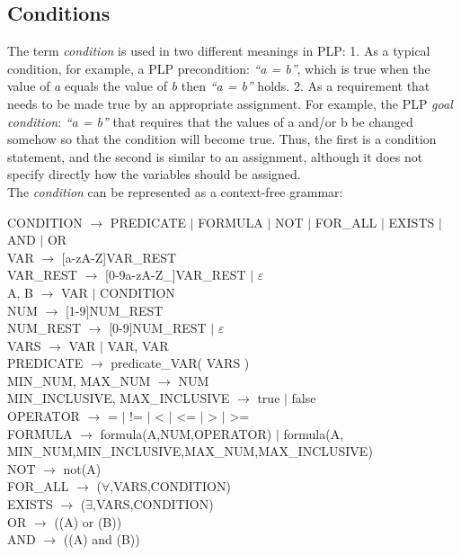 \subsection{Conditions}
The term \textit{condition} is used in two different meanings in PLP: 1. As a typical condition, for example, a PLP precondition: \textit{“a = b”}, which is true when the value of \textit{a} equals the value of \textit{b} then \textit{“a = b”} holds. 2. As a requirement that needs to be made true by an appropriate assignment. For example, the PLP \textit{\textit{goal condition}}: \textit{“a = b”} that requires that the values of a and/or b be changed somehow so that the condition will become true. Thus, the first is a condition statement, and the second is similar to an assignment, although it does not specify directly how the variables should be assigned. \\
The \textit{condition} can be represented as a context-free grammar: 
\begin{changemargin}{1.5cm}{0cm}
CONDITION $\rightarrow$ PREDICATE $\vert$ FORMULA $\vert$ NOT $\vert$ FOR_ALL $\vert$ EXISTS $\vert$ AND $\vert$ OR\\
VAR $\rightarrow$ [a-zA-Z]VAR_REST\\
VAR_REST $\rightarrow$ [0-9a-zA-Z_]VAR_REST $\vert$ $\varepsilon$\\
A, B $\rightarrow$ VAR $\vert$ CONDITION\\
NUM $\rightarrow$ [1-9]NUM_REST\\
NUM_REST $\rightarrow$ [0-9]NUM_REST $\vert$ $\varepsilon$\\
VARS $\rightarrow$ VAR $\vert$ VAR, VAR\\
PREDICATE $\rightarrow$ predicate_VAR( VARS )\\
MIN_NUM, MAX_NUM $\rightarrow$ NUM\\
MIN_INCLUSIVE, MAX_INCLUSIVE $\rightarrow$ true $\vert$ false\\
OPERATOR $\rightarrow$ = $\vert$ != $\vert$ < $\vert$ <= $\vert$ > $\vert$ >=\\
FORMULA $\rightarrow$ formula(A,NUM,OPERATOR) $\vert$ formula(A, MIN_NUM,MIN_INCLUSIVE,MAX_NUM,MAX_INCLUSIVE)\\
NOT $\rightarrow$ not(A)\\
FOR_ALL $\rightarrow$ ($\forall$,VARS,CONDITION)\\
EXISTS $\rightarrow$ ($\exists$,VARS,CONDITION)\\
OR $\rightarrow$ ((A) or (B))\\
AND $\rightarrow$ ((A) and (B))
\end{changemargin} 
